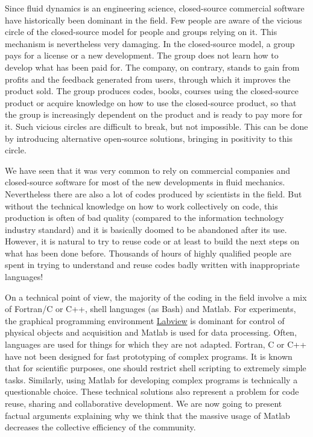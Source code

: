 Since fluid dynamics is an engineering science, closed-source commercial software
have historically been dominant in the field.
%
Few people are aware of the vicious circle of the closed-source model for people
and groups relying on it.
%
This mechanism is nevertheless very damaging. In the closed-source model, a group
pays for a license or a new development. The group does not learn how to develop
what has been paid for. The company, on contrary, stands to gain from profits and
the feedback generated from users, through which it improves the product sold.
The group produces codes, books, courses using the closed-source product or
acquire knowledge on how to use the closed-source product, so that the group is
increasingly dependent on the product and is ready to pay more for it.
%
Such vicious circles are difficult to break, but not impossible. This can be
done by introducing alternative open-source solutions, bringing in positivity to
this circle.

We have seen that it was very common to rely on commercial companies and
closed-source software for most of the new developments in fluid mechanics.
%
Nevertheless there are also a lot of codes produced by scientists in the
field. But without the technical knowledge on how to work collectively on code,
this production is often of bad quality (compared to the information technology
industry standard) and it is basically doomed to be abandoned after its use.
%
However, it is natural to try to reuse code or at least to build the next steps
on what has been done before.  Thousands of hours of highly qualified people
are spent in trying to understand and reuse codes badly written with
inappropriate languages!

On a technical point of view, the majority of the coding in the field involve a
mix of Fortran/C or C++, shell languages (as Bash) and Matlab. For experiments,
the graphical programming environment
\href{http://www.ni.com/en-us/shop/labview.html}{Labview} is dominant for
control of physical objects and acquisition and Matlab is used for data
processing.
%
Often, languages are used for things for which they are not adapted.
%
Fortran, C or C++ have not been designed for fast prototyping of complex
programs.
%
It is known that for scientific purposes, one should restrict shell scripting
to extremely simple tasks.
%
Similarly, using Matlab for developing complex programs is technically a
questionable choice.
%
These technical solutions also represent a problem for code reuse, sharing and
collaborative development.
%
We are now going to present factual arguments explaining why we think that the
massive usage of Matlab decreases the collective efficiency of the community.

